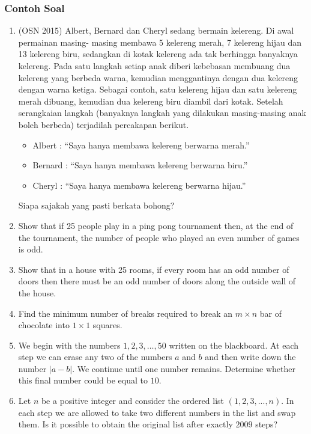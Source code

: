 \documentclass[11pt]{scrartcl}
\begin{document}
\subsubsection{Contoh Soal}
\begin{enumerate}
    \item (OSN 2015) Albert, Bernard dan Cheryl sedang bermain kelereng. Di awal permainan masing- masing membawa 5 kelereng merah, 7 kelereng hijau dan 13 kelereng biru, sedangkan di kotak kelereng ada tak berhingga banyaknya kelereng. Pada satu langkah setiap anak diberi kebebasan membuang dua kelereng yang berbeda warna, kemudian menggantinya dengan dua kelereng dengan warna ketiga. Sebagai contoh, satu kelereng hijau dan satu kelereng merah dibuang, kemudian dua kelereng biru diambil dari kotak. Setelah serangkaian langkah (banyaknya langkah yang dilakukan masing-masing anak boleh berbeda) terjadilah percakapan berikut.
    \begin{itemize}
        \item Albert : “Saya hanya membawa kelereng berwarna merah.”
        \item Bernard : “Saya hanya membawa kelereng berwarna biru.”
        \item Cheryl : “Saya hanya membawa kelereng berwarna hijau.”
    \end{itemize}
    Siapa sajakah yang pasti berkata bohong?
    
    \item Show that if 25 people play in a ping pong tournament then, at the end of the tournament, the number of people who played an even number of games is odd.

    \item Show that in a house with 25 rooms, if every room has an odd number of doors then there must be an odd number of doors along the outside wall of the house.
    
    \item Find the minimum number of breaks required to break an $m \times n$ bar of chocolate into $1 \times 1$ squares.
    
    \item We begin with the numbers $1, 2, 3, \ldots , 50$ written on the blackboard. At each step we can erase any two of the numbers $a$ and $b$ and then write down the number $|a-b|$. We continue until one number remains. Determine whether this final number could be equal to $10$.

    \item Let $n$ be a positive integer and consider the ordered list $(1, 2, 3,...,n)$. In each step we are allowed to take two different numbers in the list and swap them. Is it possible to obtain the original list after exactly $2009$ steps?


\end{enumerate}
\end{document}
